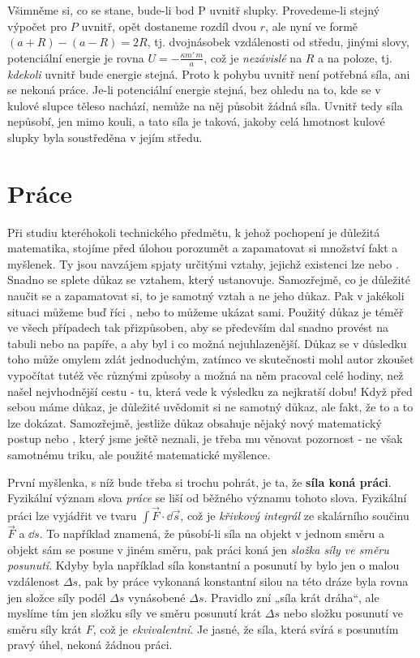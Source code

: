     Všimněme si, co se stane, bude-li bod P uvnitř slupky. Provedeme-li stejný výpočet pro \(P\) 
    uvnitř, opět dostaneme rozdíl dvou \(r\), ale nyní ve formě \((a + R) - (a - R) =2R\), tj. 
    dvojnásobek vzdálenosti od středu, jinými slovy, potenciální energie je rovna \(U = - 
    \frac{\kappa m'\,m}{a}\), což je \emph{nezávislé} na \(R\) a na poloze, tj. \emph{kdekoli} 
    uvnitř bude energie stejná. Proto k pohybu uvnitř není potřebná síla, ani se nekoná práce. 
    Je-li potenciální energie stejná, bez ohledu na to, kde se v kulové slupce těleso nachází, 
    nemůže na něj působit žádná síla. Uvnitř tedy síla nepůsobí, jen mimo kouli, a tato síla je 
    taková, jakoby celá hmotnost kulové slupky byla soustředěna v jejím středu.

  \section{Práce}
    Při studiu kteréhokoli technického předmětu, k jehož pochopení je důležitá matematika, stojíme 
    před úlohou porozumět a zapamatovat si množství fakt a myšlenek. Ty jsou navzájem spjaty 
    určitými vztahy, jejichž existenci lze  nebo . Snadno se splete důkaz se 
    vztahem, který ustanovuje. Samozřejmě, co je důležité naučit se a zapamatovat si, to je samotný 
    vztah a ne jeho důkaz. Pak v jakékoli situaci můžeme buď říci , nebo to můžeme ukázat sami. Použitý důkaz je téměř ve všech případech tak přizpůsoben, 
    aby se především dal snadno provést na tabuli nebo na papíře, a aby byl i co možná 
    nejuhlazenější. Důkaz se v důsledku toho může omylem zdát jednoduchým, zatímco ve skutečnosti 
    mohl autor zkoušet vypočítat tutéž věc různými způsoby a možná na něm pracoval celé hodiny, než 
    našel nejvhodnější cestu - tu, která vede k výsledku za nejkratší dobu! Když před sebou máme 
    důkaz, je důležité uvědomit si ne samotný důkaz, ale fakt, že to a to lze dokázat. Samozřejmě, 
    jestliže důkaz obsahuje nějaký nový matematický postup nebo , který jsme ještě 
    neznali, je třeba mu věnovat pozornost - ne však samotnému triku, ale použité matematické 
    myšlence.

    První myšlenka, s níž bude třeba si trochu pohrát, je ta, že \textbf{síla koná práci}. 
    Fyzikální význam slova \emph{práce} se liší od běžného významu tohoto slova. Fyzikální práci 
    lze vyjádřit ve tvaru \(\int\vec{F}\cdot\dd{\vec{s}}\), což je \emph{křivkový integrál} ze 
    skalárního součinu \(\vec{F}\) a \(\dd{s}\). To například znamená, že působí-li síla na objekt 
    v jednom směru a objekt sám se posune v jiném směru, pak práci koná jen \emph{složka síly ve 
    směru posunutí}. Kdyby byla například síla konstantní a posunutí by bylo jen o malou vzdálenost 
    \(\Delta s\), pak by práce vykonaná konstantní silou na této dráze byla rovna jen složce síly 
    podél \(\Delta s\) vynásobené \(\Delta s\). Pravidlo zní „síla krát dráha“, ale myslíme tím jen 
    složku síly ve směru posunutí krát \(\Delta s\) nebo složku posunutí ve směru síly krát 
    \(F\), což je \emph{ekvivalentní}. Je jasné, že síla, která svírá s posunutím pravý úhel, 
    nekoná žádnou práci.
    
